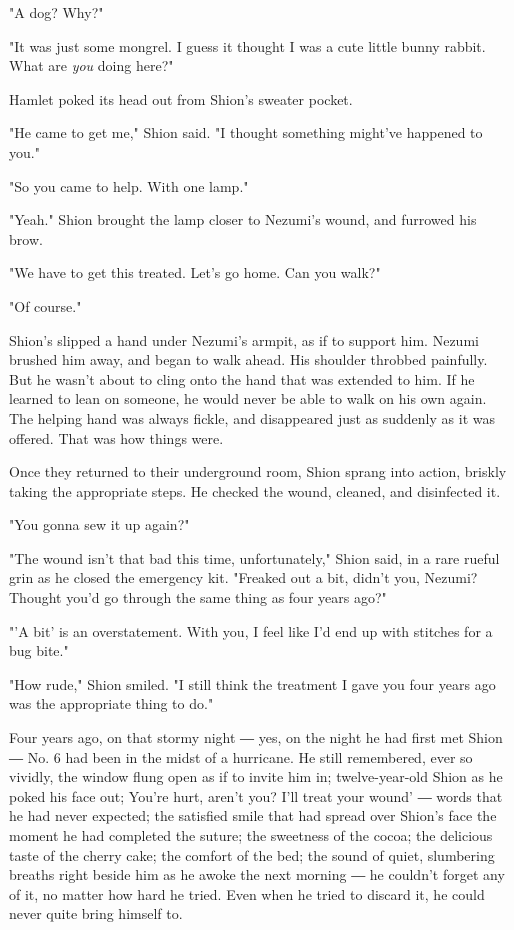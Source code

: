 "A dog? Why?"

"It was just some mongrel. I guess it thought I was a cute little bunny
rabbit. What are \emph{you} doing here?"

Hamlet poked its head out from Shion's sweater pocket.

"He came to get me," Shion said. "I thought something might've happened
to you."

"So you came to help. With one lamp."

"Yeah." Shion brought the lamp closer to Nezumi's wound, and furrowed
his brow.

"We have to get this treated. Let's go home. Can you walk?"

"Of course."

Shion's slipped a hand under Nezumi's armpit, as if to support him.
Nezumi brushed him away, and began to walk ahead. His shoulder throbbed
painfully. But he wasn't about to cling onto the hand that was extended
to him. If he learned to lean on someone, he would never be able to walk
on his own again. The helping hand was always fickle, and disappeared
just as suddenly as it was offered. That was how things were.

Once they returned to their underground room, Shion sprang into action,
briskly taking the appropriate steps. He checked the wound, cleaned, and
disinfected it.

"You gonna sew it up again?"

"The wound isn't that bad this time, unfortunately," Shion said, in a
rare rueful grin as he closed the emergency kit. "Freaked out a bit,
didn't you, Nezumi? Thought you'd go through the same thing as four
years ago?"

"'A bit' is an overstatement. With you, I feel like I'd end up with
stitches for a bug bite."

"How rude," Shion smiled. "I still think the treatment I gave you four
years ago was the appropriate thing to do."

Four years ago, on that stormy night ― yes, on the night he had first
met Shion ― No. 6 had been in the midst of a hurricane. He still
remembered, ever so vividly, the window flung open as if to invite him
in; twelve-year-old Shion as he poked his face out; You're hurt, aren't
you? I'll treat your wound' ― words that he had never expected; the
satisfied smile that had spread over Shion's face the moment he had
completed the suture; the sweetness of the cocoa; the delicious taste of
the cherry cake; the comfort of the bed; the sound of quiet, slumbering
breaths right beside him as he awoke the next morning ― he couldn't
forget any of it, no matter how hard he tried. Even when he tried to
discard it, he could never quite bring himself to.

